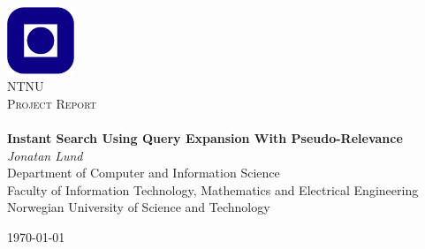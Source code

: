 \begin{titlepage}
\begin{center}
\includegraphics[width=0.15\textwidth]{img/NTNU.png}~\\[1cm]

\textsc{\LARGE NTNU}\\[1.5cm]

\textsc{\Large Project Report}\\[0.5cm]

\HRule \\[0.4cm]
{ \huge \bfseries Instant Search Using Query Expansion With Pseudo-Relevance}\\[0.5cm]
{\large \textit{Jonatan Lund}}\\[0.2cm]
Department of Computer and Information Science \\
Faculty of Information Technology, Mathematics and Electrical Engineering \\
Norwegian University of Science and Technology
\HRule \\[1.5cm]



\vfill

{\large \today}
\end{center}
\end{titlepage}
